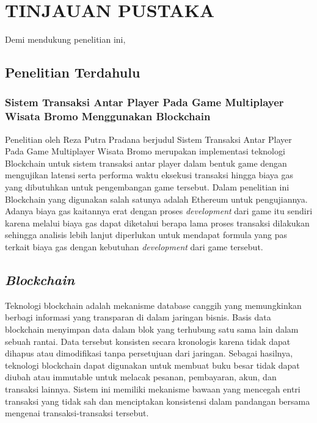\chapter{TINJAUAN PUSTAKA}
\label{chap:tinjauanpustaka}


Demi mendukung penelitian ini, \lipsum[1][1-5]

\section{Penelitian Terdahulu}
\label{sec:penelitianterdahulu}

\subsection{Sistem Transaksi Antar Player Pada Game Multiplayer Wisata Bromo Menggunakan Blockchain}
\label{subsec:sistemtransaksiblockchainreza}
Penelitian oleh Reza Putra Pradana berjudul Sistem Transaksi Antar Player Pada Game Multiplayer Wisata
Bromo merupakan implementasi teknologi Blockchain untuk sistem transaksi antar player dalam bentuk game
dengan mengujikan latensi serta performa waktu eksekusi transaksi hingga biaya gas yang dibutuhkan untuk
pengembangan game tersebut. Dalam penelitian ini Blockchain yang digunakan salah satunya adalah Ethereum untuk pengujiannya.
Adanya biaya gas kaitannya erat dengan proses \emph{development} dari game itu sendiri karena melalui biaya gas
dapat diketahui berapa lama proses transaksi dilakukan sehingga analisis lebih lanjut diperlukan untuk mendapat formula yang pas terkait biaya gas dengan kebutuhan \emph{development} dari game tersebut.

\section{\emph{Blockchain}}
\label{sec:blockchain}
Teknologi blockchain adalah mekanisme database canggih yang memungkinkan berbagi informasi yang transparan di dalam jaringan bisnis.
Basis data blockchain menyimpan data dalam blok yang terhubung satu sama lain dalam sebuah rantai. Data tersebut konsisten secara kronologis
karena tidak dapat dihapus atau dimodifikasi tanpa persetujuan dari jaringan. Sebagai hasilnya, teknologi blockchain dapat digunakan untuk
membuat buku besar tidak dapat diubah atau immutable untuk melacak pesanan, pembayaran, akun, dan transaksi lainnya. Sistem ini memiliki
mekanisme bawaan yang mencegah entri transaksi yang tidak sah dan menciptakan konsistensi dalam pandangan bersama mengenai transaksi-transaksi tersebut.

